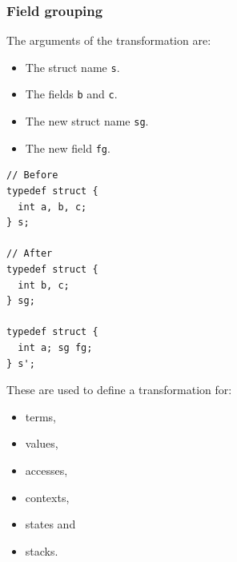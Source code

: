 \begin{frame}[fragile]
\frametitle{Field grouping}

The arguments of the transformation are:
\begin{minipage}{0.55\linewidth}
\begin{itemize}
	\setlength\itemsep{1.5em}
	\item The struct name \texttt{s}.
	\item The fields \texttt{b} and \texttt{c}.
	\item The new struct name \texttt{sg}.
	\item The new field \texttt{fg}.
\end{itemize}
\end{minipage}%
\begin{minipage}{0.35\linewidth}
\begin{lstlisting}[style=Cstyle, basicstyle=\scriptsize]
// Before
typedef struct {
  int a, b, c;
} s;

// After
typedef struct {
  int b, c;
} sg;

typedef struct {
  int a; sg fg;
} s';
\end{lstlisting}
\end{minipage}

\bigskip

These are used to define a transformation for:
\\[0.75em]
\begin{minipage}{0.3\linewidth}

\begin{itemize}
	\item terms,
	\item values,
\end{itemize}
\end{minipage}%
\begin{minipage}{0.3\linewidth}
\begin{itemize}
	\item accesses,
	\item contexts,
\end{itemize}
\end{minipage}%
\begin{minipage}{0.3\linewidth}
\begin{itemize}
	\item states and
	\item stacks.
\end{itemize}
\end{minipage}

\end{frame}


